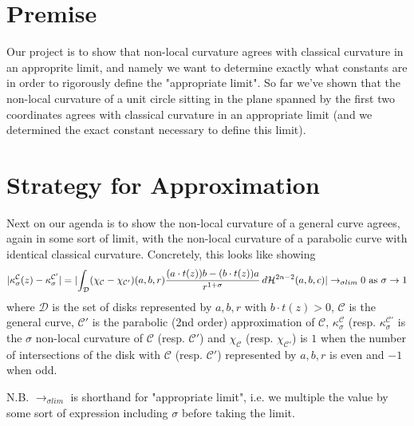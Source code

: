 \documentclass{article}
\newcommand{\haus}[2]{\mathcal{H}^{#1}\parens{#2}}
\begin{document}
\section{Premise}%
Our project is to show that non-local curvature agrees with classical curvature in an approprite limit, and namely we want to determine exactly what constants are in order to rigorously define the "appropriate limit". So far we've shown that the non-local curvature of a unit circle sitting in the plane spanned by the first two coordinates agrees with classical curvature in an appropriate limit (and we determined the exact constant necessary to define this limit).
\section{Strategy for Approximation}%
Next on our agenda is to show the non-local curvature of a general curve agrees, again in some sort of limit, with the non-local curvature of a parabolic curve with identical classical curvature. Concretely, this looks like showing
$$
\abs{ \kappa_\sigma^\mathcal{C}(z) - \kappa_\sigma^{\mathcal{C}'} } = \abs{\int_{\mathcal{D}} \parens{\chi_\mathcal{C} - \chi_{\mathcal{C}'}}(a, b, r) \frac{\parens{a \cdot t(z)}b - \parens{b \cdot t(z)} a}{r^{1+\sigma}} \, d\haus{2n-2}{a,b,c}} \to_{\sigma lim} 0 \textup{ as } \sigma \to 1
$$
where $\mathcal{D}$ is the set of disks represented by $a, b, r$ with $b \cdot t(z) > 0$, $\mathcal{C}$ is the general curve, $\mathcal{C}'$ is the parabolic (2nd order) approximation of $\mathcal{C}$, $\kappa_\sigma^\mathcal{C}$ (resp. $\kappa_\sigma^{\mathcal{C}'}$ is the $\sigma$ non-local curvature of $\mathcal{C}$ (resp. $\mathcal{C}'$) and $\chi_\mathcal{C}$ (resp. $\chi_{\mathcal{C}'}$) is $1$ when the number of intersections of the disk with $\mathcal{C}$ (resp. $\mathcal{C}'$) represented by $a, b, r$ is even and $-1$ when odd.

N.B. $\to_{\sigma lim}$ is shorthand for "appropriate limit", i.e. we multiple the value by some sort of expression including $\sigma$ before taking the limit.
\end{document}
